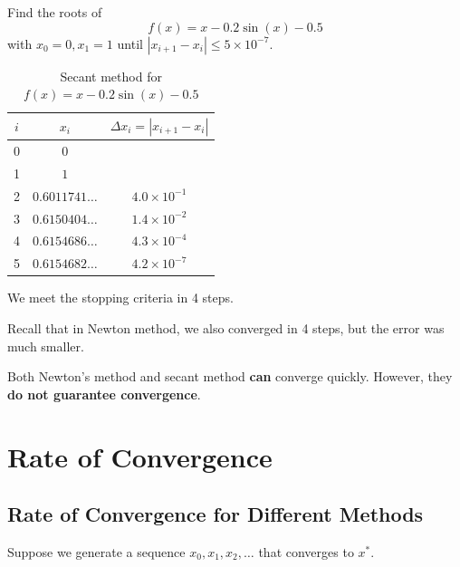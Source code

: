 \begin{example}
    Find the roots of \[
        f(x) = x - 0.2 \sin(x) - 0.5
    \] with \( x_0 = 0, x_1 = 1 \) until \( |x_{i+1} - x_i| \leq 5 \times 10^{-7} \).

    \begin{table}[H]
        \centering
        \begin{tabular}{c|c|c}
            \( i \)
             & \( x_i \)
             & \( \Delta x_i = | x_{i+1} - x_i | \)
            \\ \hline \hline
            0
             & \( 0 \)
             &
            \\
            1
             & \( 1 \)
             &
            \\
            2
             & \( 0.6011741\ldots \)
             & \( 4.0 \times 10^{-1} \)
            \\
            3
             &
            \( 0.6150404\ldots \)
             & \( 1.4 \times 10^{-2} \)
            \\
            4
             & \( 0.6154686\ldots \)
             & \( 4.3 \times 10^{-4} \)
            \\
            5
             & \( 0.6154682\ldots \)
             & \( 4.2 \times 10^{-7} \)
        \end{tabular}
        \caption{Secant method for \( f(x) = x - 0.2 \sin(x) - 0.5 \)}
    \end{table}
    We meet the stopping criteria in 4 steps.

    Recall that in Newton method, we also converged in 4 steps, but the error was much smaller.
\end{example}

\begin{remark}
    Both Newton's method and secant method \textbf{can} converge quickly. However, they \textbf{do not guarantee convergence}.
\end{remark}

\section{Rate of Convergence}

\subsection{Rate of Convergence for Different Methods}

Suppose we generate a sequence \( x_0, x_1, x_2, \dots \) that converges to \( x^\ast \).

